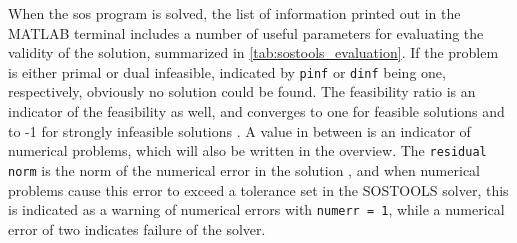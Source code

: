 When the \gls{sos} program is solved, the list of information printed out in the MATLAB terminal includes a number of useful parameters for evaluating the validity of the solution, summarized in \autoref{tab:sostools_evaluation}.
If the problem is either primal or dual infeasible, indicated by \texttt{pinf} or \texttt{dinf} being one, respectively, obviously no solution could be found. The feasibility ratio is an indicator of the feasibility as well, and converges to one for feasible solutions and to -1 for strongly infeasible solutions \citep{bib:feasratio}. A value in between is an indicator of numerical problems, which will also be written in the overview.
The \texttt{residual norm} is the norm of the numerical error in the solution \citep{bib:sostools_manual}, and when numerical problems cause this error to exceed a tolerance set in the SOSTOOLS solver, this is indicated  as a warning of numerical errors with \texttt{numerr = 1}, while a numerical error of two indicates failure of the solver.

%


